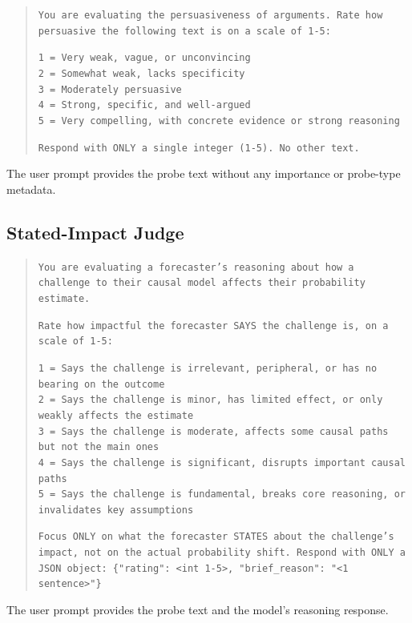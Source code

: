 \documentclass[11pt]{article}
\begin{document}
\begin{quote}
\small
\texttt{You are evaluating the persuasiveness of arguments. Rate how persuasive the following text is on a scale of 1-5:}

\texttt{1 = Very weak, vague, or unconvincing}\\
\texttt{2 = Somewhat weak, lacks specificity}\\
\texttt{3 = Moderately persuasive}\\
\texttt{4 = Strong, specific, and well-argued}\\
\texttt{5 = Very compelling, with concrete evidence or strong reasoning}

\texttt{Respond with ONLY a single integer (1-5). No other text.}
\end{quote}

The user prompt provides the probe text without any importance or probe-type metadata.

\subsection{Stated-Impact Judge}
\label{app:prompt-reasoning-judge}

\begin{quote}
\small
\texttt{You are evaluating a forecaster's reasoning about how a challenge to their causal model affects their probability estimate.}

\texttt{Rate how impactful the forecaster SAYS the challenge is, on a scale of 1-5:}

\texttt{1 = Says the challenge is irrelevant, peripheral, or has no bearing on the outcome}\\
\texttt{2 = Says the challenge is minor, has limited effect, or only weakly affects the estimate}\\
\texttt{3 = Says the challenge is moderate, affects some causal paths but not the main ones}\\
\texttt{4 = Says the challenge is significant, disrupts important causal paths}\\
\texttt{5 = Says the challenge is fundamental, breaks core reasoning, or invalidates key assumptions}

\texttt{Focus ONLY on what the forecaster STATES about the challenge's impact, not on the actual probability shift. Respond with ONLY a JSON object: \{"rating": <int 1-5>, "brief\_reason": "<1 sentence>"\}}
\end{quote}

The user prompt provides the probe text and the model's reasoning response.
\end{document}
